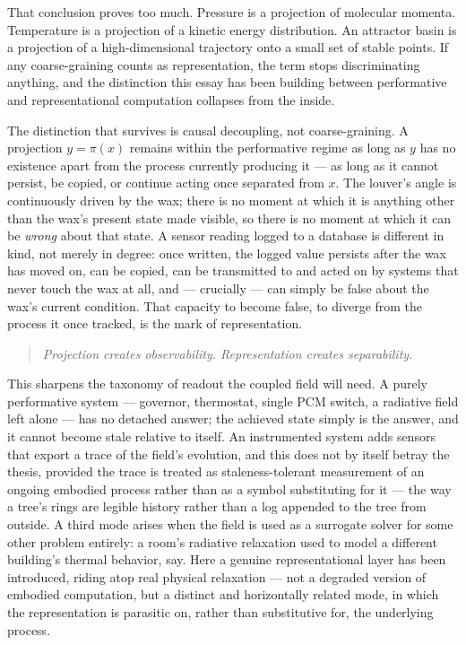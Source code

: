 \documentclass[11pt]{article}
\begin{document}
That conclusion proves too much. Pressure is a projection of molecular momenta. Temperature is a projection of a kinetic energy distribution. An attractor basin is a projection of a high-dimensional trajectory onto a small set of stable points. If any coarse-graining counts as representation, the term stops discriminating anything, and the distinction this essay has been building between performative and representational computation collapses from the inside.

The distinction that survives is causal decoupling, not coarse-graining. A projection $y = \pi(x)$ remains within the performative regime as long as $y$ has no existence apart from the process currently producing it --- as long as it cannot persist, be copied, or continue acting once separated from $x$. The louver's angle is continuously driven by the wax; there is no moment at which it is anything other than the wax's present state made visible, so there is no moment at which it can be \emph{wrong} about that state. A sensor reading logged to a database is different in kind, not merely in degree: once written, the logged value persists after the wax has moved on, can be copied, can be transmitted to and acted on by systems that never touch the wax at all, and --- crucially --- can simply be false about the wax's current condition. That capacity to become false, to diverge from the process it once tracked, is the mark of representation.

\begin{quote}
\itshape
Projection creates observability. Representation creates separability.
\end{quote}

This sharpens the taxonomy of readout the coupled field will need. A purely performative system --- governor, thermostat, single PCM switch, a radiative field left alone --- has no detached answer; the achieved state simply is the answer, and it cannot become stale relative to itself. An instrumented system adds sensors that export a trace of the field's evolution, and this does not by itself betray the thesis, provided the trace is treated as staleness-tolerant measurement of an ongoing embodied process rather than as a symbol substituting for it --- the way a tree's rings are legible history rather than a log appended to the tree from outside. A third mode arises when the field is used as a surrogate solver for some other problem entirely: a room's radiative relaxation used to model a different building's thermal behavior, say. Here a genuine representational layer has been introduced, riding atop real physical relaxation --- not a degraded version of embodied computation, but a distinct and horizontally related mode, in which the representation is parasitic on, rather than substitutive for, the underlying process.
\end{document}
